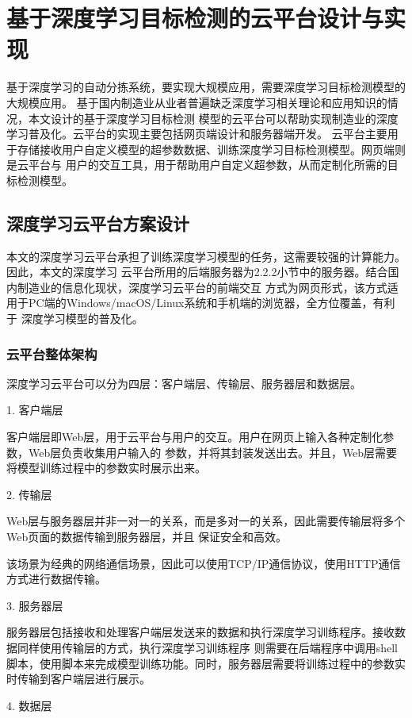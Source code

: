 \chapter{基于深度学习目标检测的云平台设计与实现}

基于深度学习的自动分拣系统，要实现大规模应用，需要深度学习目标检测模型的大规模应用。
基于国内制造业从业者普遍缺乏深度学习相关理论和应用知识的情况，本文设计的基于深度学习目标检测
模型的云平台可以帮助实现制造业的深度学习普及化。云平台的实现主要包括网页端设计和服务器端开发。
云平台主要用于存储接收用户自定义模型的超参数数据、训练深度学习目标检测模型。网页端则是云平台与
用户的交互工具，用于帮助用户自定义超参数，从而定制化所需的目标检测模型。

\section{深度学习云平台方案设计}

本文的深度学习云平台承担了训练深度学习模型的任务，这需要较强的计算能力。因此，本文的深度学习
云平台所用的后端服务器为2.2.2小节中的服务器。结合国内制造业的信息化现状，深度学习云平台的前端交互
方式为网页形式，该方式适用于PC端的Windows/macOS/Linux系统和手机端的浏览器，全方位覆盖，有利于
深度学习模型的普及化。

\subsection{云平台整体架构}

深度学习云平台可以分为四层：客户端层、传输层、服务器层和数据层。

1. 客户端层

客户端层即Web层，用于云平台与用户的交互。用户在网页上输入各种定制化参数，Web层负责收集用户输入的
参数，并将其封装发送出去。并且，Web层需要将模型训练过程中的参数实时展示出来。

2. 传输层

Web层与服务器层并非一对一的关系，而是多对一的关系，因此需要传输层将多个Web页面的数据传输到服务器层，并且
保证安全和高效。

该场景为经典的网络通信场景，因此可以使用TCP/IP通信协议，使用HTTP通信方式进行数据传输。

3. 服务器层

服务器层包括接收和处理客户端层发送来的数据和执行深度学习训练程序。接收数据同样使用传输层的方式，执行深度学习训练程序
则需要在后端程序中调用shell脚本，使用脚本来完成模型训练功能。同时，服务器层需要将训练过程中的参数实时传输到客户端层进行展示。

4. 数据层

